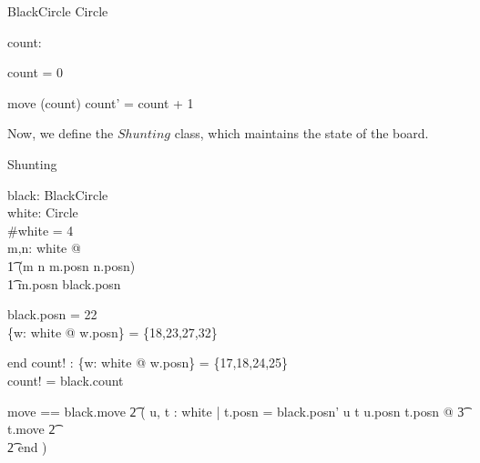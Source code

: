 \documentclass[11pt,a4paper]{article}
\begin{document}
\begin{class}{BlackCircle}
\also
\inherits Circle\\

\begin{state}
  count: \nat
\end{state}

\begin{init}
  count = 0
\end{init}

\begin{schema}{move}
  \Delta(count)
\where
  count' = count + 1
\end{schema}
\end{class}

Now, we define the $Shunting$ class, which maintains the state of the
board.

\begin{class}{Shunting}
\also
\begin{state}
  black: BlackCircle \\
  white: \power Circle \\
\where
  \#white = 4 \\
  \forall m,n: white @ \\
      \t1 (m \neq n \iff m.posn \neq n.posn) \land \\
      \t1 m.posn \neq black.posn
\end{state}

\begin{init}
  black.posn = 22 \\
  \{w: white @ w.posn\} = \{18,23,27,32\} \\ 
\end{init}
 
\begin{schema}{end}
  count! : \nat
\where
  \{w: white @ w.posn\} = \{17,18,24,25\} \\
  count! = black.count
\end{schema} 

move == black.move \land
         \t2 ( \dgch u, t : white | t.posn = black.posn' \land
                u \neq t \land u.posn \neq t.posn @
		\t3 t.move
		\t2 \gch \\
		\t2 end )
\end{class}
\end{document}
